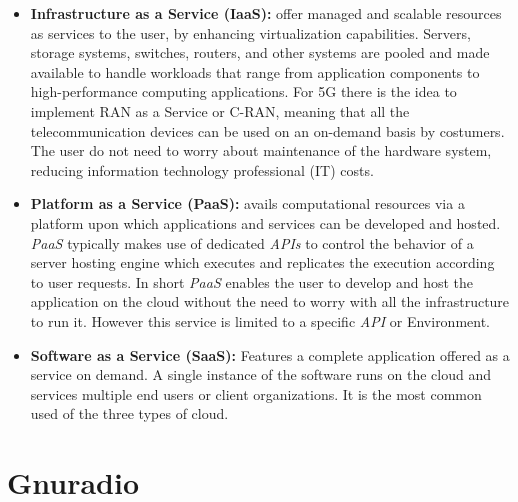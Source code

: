 \begin{itemize}

    \item \textbf{Infrastructure as a Service (IaaS):} offer managed and
    scalable resources as services to the user, by enhancing virtualization
    capabilities. Servers, storage systems, switches, routers, and other systems
    are pooled and made available to handle workloads that range from
    application components to high-performance computing applications. For 5G
    there is the idea to implement RAN as a Service or C-RAN, meaning that all
    the telecommunication devices can be used on an on-demand basis by
    costumers. The user do not need to worry about maintenance of the hardware
    system, reducing information technology professional (IT) costs.

    \item \textbf{Platform as a Service (PaaS):} avails computational resources
    via a platform upon which applications and services can be developed and
    hosted. \textit{PaaS} typically makes use of dedicated \textit{APIs} to
    control the behavior of a server hosting engine which executes and
    replicates the execution according to user requests. In short \textit{PaaS}
    enables the user to develop and host the application on the cloud without
    the need to worry with all the infrastructure to run it. However this
    service is limited to a specific \textit{API} or Environment.

     \item \textbf{Software as a Service (SaaS):} Features a complete application
     offered as a service on demand. A single instance of the software runs on the
     cloud and services multiple end users or client organizations. It is the most
     common used of the three types of cloud.

\end{itemize}


\section{Gnuradio}
\label{sdr:gnuradio}

